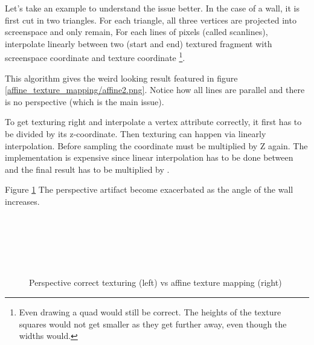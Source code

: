 \par
Let's take an example to understand the issue better. In the case of a wall, it is first cut in two triangles. For each triangle, all three vertices  are projected into screenspace and only  remain, For each lines of pixels (called scanlines), interpolate linearly between two (start and end) textured fragment with screenspace coordinate  and texture coordinate \footnote{ Even drawing a quad would still be correct. The heights of the texture squares would not get smaller as they get further away, even though the widths would.}.\\
\par
This algorithm gives the weird looking result featured in figure \ref{affine_texture_mapping/affine2.png}. Notice how all lines are parallel and there is no perspective (which is the main issue).\\
\par
{}
\par
To get texturing right and interpolate a vertex attribute correctly, it first has to be divided by its z-coordinate. Then texturing can happen via linearly interpolation. Before sampling the coordinate must be multiplied by Z again. The implementation is expensive since linear interpolation has to be done between  and the final result has to be multiplied by .\\
\par
Figure \ref{texture_anmgle} The perspective artifact become exacerbated as the angle of the wall increases.\\ 
\pagebreak




\par
\begin{figure}[H] \centering
\begin{minipage}{\textwidth}
 \hspace{2cm}
\\
\par

 \hspace{2cm}
\\
\par

 \hspace{2cm}
\\
\par
\end{minipage}
\caption{Perspective correct texturing (left) vs affine texture mapping (right)}
\label{texture_anmgle}
\end{figure}
\par

